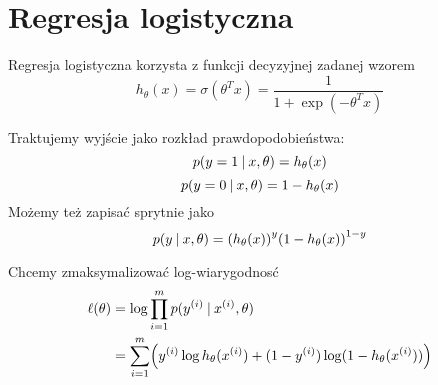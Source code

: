 \section{Regresja logistyczna}

Regresja logistyczna korzysta z funkcji decyzyjnej zadanej wzorem
\[
	h_\theta(x) = \sigma(\theta^T x) = \frac{1}{1 + \exp(-\theta^Tx)}
\]

Traktujemy wyjście jako rozkład prawdopodobieństwa:
\[
	p(y = 1 \:\vert\: x, \theta) = h_\theta(x)
\]
\[
	p(y = 0 \:\vert\: x, \theta) = 1 - h_\theta(x)
\]
Możemy też zapisać sprytnie jako
\[
	p(y \given x, \theta) = \pars{h_\theta(x)}^y\pars{1 - h_\theta(x)}^{1-y}
\]

Chcemy zmaksymalizować log-wiarygodnosć
\begin{align*}
	\ell(\theta)
	 & = \log \prod_{i=1}^m p(y^{(i)} \given x^{(i)}, \theta)                                            \\
	 & = \sum_{i=1}^m \pars{y^{(i)} \log h_\theta(x^{(i)}) + (1 - y^{(i)}) \log (1 - h_\theta(x^{(i)}))}
\end{align*}